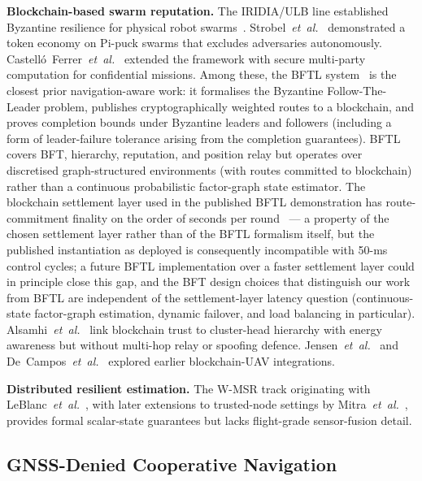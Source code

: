 \documentclass[conference,10pt]{IEEEtran}
\begin{document}
\textbf{Blockchain-based swarm reputation.} The IRIDIA/ULB line established Byzantine resilience for physical robot swarms~\cite{strobel2020blockchain,strobel2023robot,vancalck2023cooperation,dorigo2024nature}. Strobel~\emph{et~al.}~\cite{strobel2023robot} demonstrated a token economy on Pi-puck swarms that excludes adversaries autonomously. Castelló~Ferrer~\emph{et~al.}~\cite{castelloferrer2021secure} extended the framework with secure multi-party computation for confidential missions. Among these, the BFTL system~\cite{castelloferrer2022bftl} is the closest prior navigation-aware work: it formalises the Byzantine Follow-The-Leader problem, publishes cryptographically weighted routes to a blockchain, and proves completion bounds under Byzantine leaders and followers (including a form of leader-failure tolerance arising from the completion guarantees). BFTL covers BFT, hierarchy, reputation, and position relay but operates over discretised graph-structured environments (with routes committed to blockchain) rather than a continuous probabilistic factor-graph state estimator. The blockchain settlement layer used in the published BFTL demonstration has route-commitment finality on the order of seconds per round~\cite{strobel2020blockchain} --- a property of the chosen settlement layer rather than of the BFTL formalism itself, but the published instantiation as deployed is consequently incompatible with 50-ms control cycles; a future BFTL implementation over a faster settlement layer could in principle close this gap, and the BFT design choices that distinguish our work from BFTL are independent of the settlement-layer latency question (continuous-state factor-graph estimation, dynamic failover, and load balancing in particular). Alsamhi~\emph{et~al.}~\cite{alsamhi2023blockchain} link blockchain trust to cluster-head hierarchy with energy awareness but without multi-hop relay or spoofing defence. Jensen~\emph{et~al.}~\cite{jensen2019blockchain} and De~Campos~\emph{et~al.}~\cite{decampos2021iota} explored earlier blockchain-UAV integrations.

\textbf{Distributed resilient estimation.} The W-MSR track originating with LeBlanc~\emph{et~al.}~\cite{leblanc2013resilient}, with later extensions to trusted-node settings by Mitra~\emph{et~al.}~\cite{mitra2019resilient}, provides formal scalar-state guarantees but lacks flight-grade sensor-fusion detail.

\subsection{GNSS-Denied Cooperative Navigation}
\end{document}
